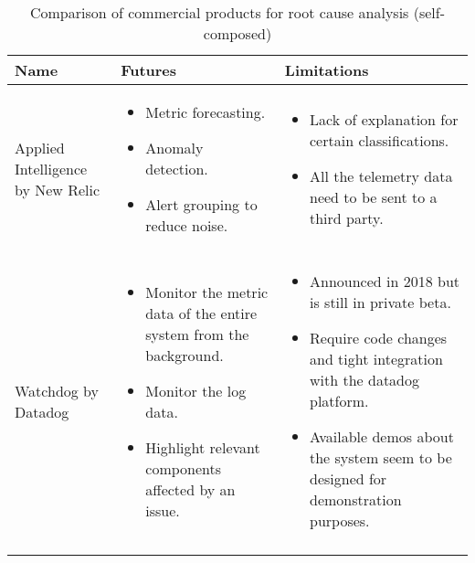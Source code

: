 \begin{longtable}{| p{40mm} | p{55mm} | p{55mm} |}
\hline
  \textbf{Name} &
  \textbf{Futures} &
  \textbf{Limitations} \\ \hline
  Applied Intelligence by New Relic &
  \vspace{-8mm}
  \begin{itemize}[leftmargin=*,noitemsep,nolistsep] 
    \item Metric forecasting.
    \item Anomaly detection.
    \item Alert grouping to reduce noise.
  \vspace{-7mm}
  \end{itemize} &
  \vspace{-8mm}
  \begin{itemize}[leftmargin=*,noitemsep,nolistsep] 
    \item Lack of explanation for certain classifications.
    \item All the telemetry data need to be sent to a third party.
  \vspace{-7mm}
  \end{itemize} \\ \hline
  Watchdog by Datadog &
  \vspace{-8mm}
  \begin{itemize}[leftmargin=*,noitemsep,nolistsep] 
    \item Monitor the metric data of the entire system from the background.
    \item Monitor the log data.
    \item Highlight relevant components affected by an issue.
  \vspace{-7mm}
  \end{itemize} &
  \vspace{-8mm}
  \begin{itemize}[leftmargin=*,noitemsep,nolistsep] 
    \item Announced in 2018 but is still in private beta.
    \item Require code changes and tight integration with the datadog platform.
    \item Available demos about the system seem to be designed for demonstration purposes.
  \vspace{-7mm}
  \end{itemize} \\ \hline
  \caption{Comparison of commercial products for root cause analysis (self-composed)}
\end{longtable}